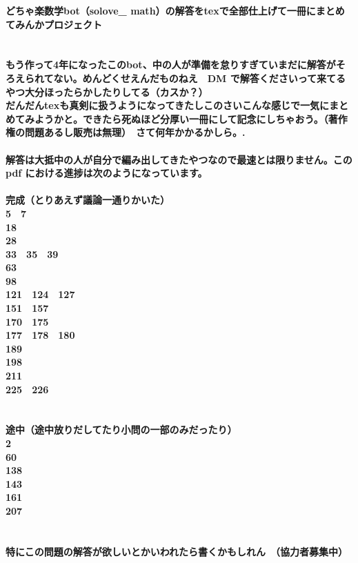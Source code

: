 \documentclass[twocolumn]{jsarticle}
\begin{document}
\fontsize{9pt}{7pt}\selectfont
\bf
{\Large どちゃ楽数学bot（solove\_ math）の解答をtexで全部仕上げて一冊にまとめてみんかプロジェクト}\\
\\
\\
もう作って4年になったこのbot、中の人が準備を怠りすぎていまだに解答がそろえられてない。めんどくせえんだものねえ　DM
で解答くださいって来てるやつ大分ほったらかしたりしてる（カスか？）\\
だんだんtexも真剣に扱うようになってきたしこのさいこんな感じで一気にまとめてみようかと。できたら死ぬほど分厚い一冊にして記念にしちゃおう。（著作権の問題あるし販売は無理）　さて何年かかるかしら。.
\\
\\

解答は大抵中の人が自分で編み出してきたやつなので最速とは限りません。このpdf
における進捗は次のようになっています。
\\
\\
完成（とりあえず議論一通りかいた）\\
5　7\\
18\\
28\\
33　35　39\\
63\\
98\\
121　124　127\\
151　157\\
170　175\\
177　178　180\\
189\\
198\\
211\\
225　226\\
\\
\\
途中（途中放りだしてたり小問の一部のみだったり）\\
2\\
60\\
138\\
143\\
161\\
207\\
\\
\\
特にこの問題の解答が欲しいとかいわれたら書くかもしれん　（協力者募集中）

\newpage
\end{document}
